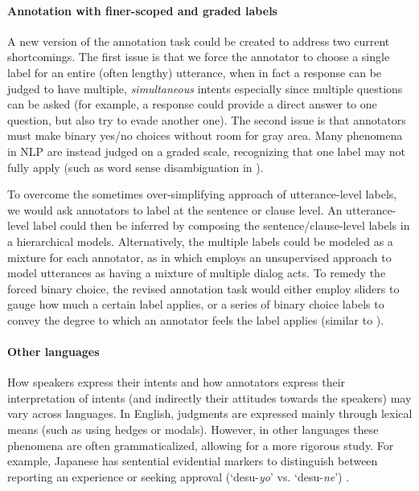 \paragraph{Annotation with finer-scoped and graded labels}
A new version of the annotation task could be created to address two current shortcomings. The first issue is that we force the annotator to choose a single label for an entire (often lengthy) utterance, when in fact a response can be judged to have multiple, \emph{simultaneous} intents especially since multiple questions can be asked (for example, a response could provide a direct answer to one question, but also try to evade another one). The second issue is that annotators must make binary yes/no choices without room for gray area. Many phenomena in NLP are instead judged on a graded scale, recognizing that one label may not fully apply (such as word sense disambiguation in ).

To overcome the sometimes over-simplifying approach of utterance-level labels, we would ask annotators to label at the sentence or clause level. An utterance-level label could then be inferred by composing the sentence/clause-level labels in a hierarchical models. Alternatively, the multiple labels could be modeled as a mixture for each annotator, as in  which employs an unsupervised approach to model utterances as having a mixture of multiple dialog acts. To remedy the forced binary choice, the revised annotation task would either employ sliders to gauge how much a certain label applies, or a series of binary choice labels to convey the degree to which an annotator feels the label applies (similar to ). 

\paragraph{Other languages}
How speakers express their intents and how annotators express their interpretation of intents (and indirectly their attitudes towards the speakers) may vary across languages. In English, judgments are expressed mainly through lexical means (such as using hedges or modals). However, in other languages these phenomena are often grammaticalized, allowing for a more rigorous study. For example, Japanese has sentential evidential markers to distinguish between reporting an experience or seeking approval (`desu-\textit{yo}' vs. `desu-\textit{ne}') \cite{Stojanovic:2019}. %